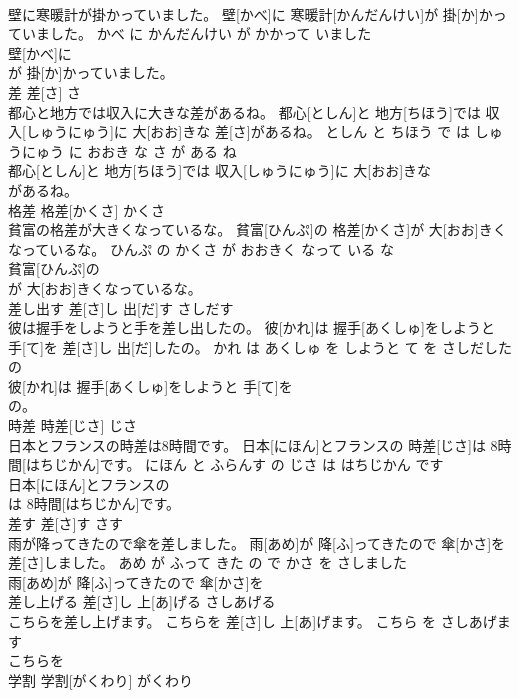 \documentclass[8pt]{extreport}
\begin{document}
\begin{CJK}{UTF8}{min}
\\	壁に寒暖計が掛かっていました。	壁[かべ]に 寒暖計[かんだんけい]が 掛[か]かっていました。	かべ に かんだんけい が かかって いました	
\\	壁[かべ]に
\\	が 掛[か]かっていました。			
\\	差	差[さ]	さ	
\\	都心と地方では収入に大きな差があるね。	都心[としん]と 地方[ちほう]では 収入[しゅうにゅう]に 大[おお]きな 差[さ]があるね。	としん と ちほう で は しゅうにゅう に おおき な さ が ある ね	
\\	都心[としん]と 地方[ちほう]では 収入[しゅうにゅう]に 大[おお]きな
\\	があるね。			
\\	格差	格差[かくさ]	かくさ	
\\	貧富の格差が大きくなっているな。	貧富[ひんぷ]の 格差[かくさ]が 大[おお]きくなっているな。	ひんぷ の かくさ が おおきく なって いる な	
\\	貧富[ひんぷ]の
\\	が 大[おお]きくなっているな。			
\\	差し出す	差[さ]し 出[だ]す	さしだす	
\\	彼は握手をしようと手を差し出したの。	彼[かれ]は 握手[あくしゅ]をしようと 手[て]を 差[さ]し 出[だ]したの。	かれ は あくしゅ を しようと て を さしだした の	
\\	彼[かれ]は 握手[あくしゅ]をしようと 手[て]を
\\	の。			
\\	時差	時差[じさ]	じさ	
\\	日本とフランスの時差は8時間です。	日本[にほん]とフランスの 時差[じさ]は 8時間[はちじかん]です。	にほん と ふらんす の じさ は はちじかん です	
\\	日本[にほん]とフランスの
\\	は 8時間[はちじかん]です。			
\\	差す	差[さ]す	さす	
\\	雨が降ってきたので傘を差しました。	雨[あめ]が 降[ふ]ってきたので 傘[かさ]を 差[さ]しました。	あめ が ふって きた の で かさ を さしました	
\\	雨[あめ]が 降[ふ]ってきたので 傘[かさ]を
\\	差し上げる	差[さ]し 上[あ]げる	さしあげる	
\\	こちらを差し上げます。	こちらを 差[さ]し 上[あ]げます。	こちら を さしあげます	
\\	こちらを
\\	学割	学割[がくわり]	がくわり	

\end{CJK}
\end{document}
